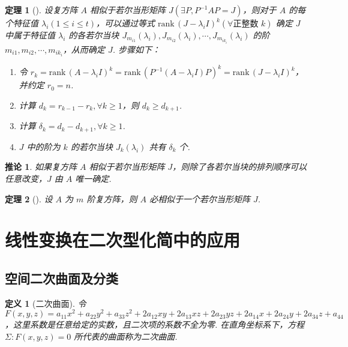 \documentclass[zihao=-4,UTF8,linespread=1.8,nothm]{aytony_base}
\newtheorem{theorem}{\indent 定理}[subsection]
\newtheorem*{corollary}{\indent 推论}
\newtheorem{definition}{\indent 定义}[subsection]
\begin{document}
\begin{theorem}[]
    设复方阵 $A$ 相似于若尔当形矩阵 $J(\exists P, P^{-1}AP = J)$，则对于 $A$ 的每个特征值 $\lambda_i(1 \leqslant i \leqslant t)$，可以通过等式 $\mathrm{rank}\,(J - \lambda_iI)^k(\forall \text{正整数 $k$})$ 确定 $J$ 中属于特征值 $\lambda_i$ 的各若尔当块 $J_{m_{i1}}(\lambda_i), J_{m_{i2}}(\lambda_i), \cdots, J_{m_{ik_i}}(\lambda_i)$ 的阶 $m_{i1}, m_{i2}, \cdots, m_{ik_i}$，从而确定 $J$. 步骤如下：

    \begin{enumerate}[nosep]
        \item 令 $r_k = \mathrm{rank}\,(A - \lambda_iI)^k = \mathrm{rank}\,(P^{-1}(A - \lambda_iI)P)^k = \mathrm{rank}\,(J - \lambda_iI)^k$，并约定 $r_0 = n$.
        \item 计算 $d_k = r_{k - 1} - r_k, \forall k \geqslant 1$，则 $d_k \geqslant d_{k+1}$.
        \item 计算 $\delta_k = d_k - d_{k + 1}, \forall k \geqslant 1$.
        \item $J$ 中的阶为 $k$ 的若尔当块 $J_k(\lambda_i)$ 共有 $\delta_k$ 个.
    \end{enumerate}
\end{theorem}

\begin{corollary}
    如果复方阵 $A$ 相似于若尔当形矩阵 $J$，则除了各若尔当块的排列顺序可以任意改变，$J$ 由 $A$ 唯一确定.
\end{corollary}

\begin{theorem}[]
    设 $A$ 为 $m$ 阶复方阵，则 $A$ 必相似于一个若尔当形矩阵 $J$.
\end{theorem}

\section{线性变换在二次型化简中的应用}

\subsection{空间二次曲面及分类}

\begin{definition}[二次曲面]
    令 $F(x, y, z) = a_{11}x^2 + a_{22}y^2 + a_{33}z^2 + 2a_{12}xy + 2a_{13}xz + 2a_{23}yz + 2a_{14}x + 2a_{24}y + 2a_{34}z + a_{44}$，这里系数是任意给定的实数，且二次项的系数不全为零. 在直角坐标系下，方程 $\varSigma:F(x, y, z) = 0$ 所代表的曲面称为二次曲面.
\end{definition}
\end{document}

